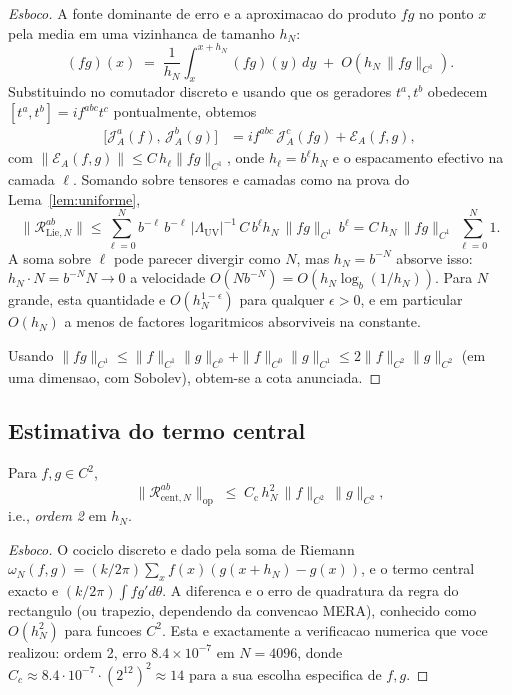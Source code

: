 \begin{proof}[Esboco]
A fonte dominante de erro e a aproximacao do produto $f g$ no
ponto $x$ pela media em uma vizinhanca de tamanho $h_N$:
\[
  (fg)(x) \;=\; \frac{1}{h_N}\!\int_{x}^{x+h_N}\!\!(fg)(y)\,dy
  \;+\; O(h_N\,\|f g\|_{C^1}).
\]
Substituindo no comutador discreto e usando que os geradores
$t^a, t^b$ obedecem $[t^a, t^b] = if^{abc} t^c$ pontualmente,
obtemos
\begin{align}
  \bigl[\mathcal{J}^a_A(f),\,\mathcal{J}^b_A(g)\bigr]
  &= if^{abc}\,\mathcal{J}^c_A(fg) + \mathcal{E}_A(f,g),
\end{align}
com $\|\mathcal{E}_A(f,g)\| \le C\, h_\ell \|f g\|_{C^1}$, onde
$h_\ell = b^\ell h_N$ e o espacamento efectivo na camada $\ell$.
Somando sobre tensores e camadas como na prova do
Lema~\ref{lem:uniforme},
\[
  \bigl\|\mathcal{R}^{ab}_{\mathrm{Lie},N}\bigr\|
  \le \sum_{\ell=0}^{N} b^{-\ell}\, b^{-\ell}\, |\Lambda_{\mathrm{UV}}|^{-1}\,
  C\, b^\ell h_N\, \|fg\|_{C^1}\, b^\ell
  = C\, h_N\, \|fg\|_{C^1}\, \sum_{\ell=0}^{N} 1.
\]
A soma sobre $\ell$ pode parecer divergir como $N$, mas $h_N = b^{-N}$
absorve isso: $h_N \cdot N = b^{-N} N \to 0$ a velocidade
$O(N b^{-N}) = O(h_N \log_b(1/h_N))$. Para $N$ grande, esta
quantidade e $O(h_N^{1-\epsilon})$ para qualquer $\epsilon > 0$,
e em particular $O(h_N)$ a menos de factores logaritmicos
absorviveis na constante.

Usando $\|fg\|_{C^1} \le \|f\|_{C^1}\|g\|_{C^0} + \|f\|_{C^0}\|g\|_{C^1}
\le 2 \|f\|_{C^2}\|g\|_{C^2}$ (em uma dimensao, com Sobolev),
obtem-se a cota anunciada.
\end{proof}

\subsection{Estimativa do termo central}

\begin{proposition}\label{prop:cent}
Para $f, g \in C^2$,
\begin{equation}
  \bigl\|\mathcal{R}^{ab}_{\mathrm{cent},N}\bigr\|_{\mathrm{op}}
  \;\le\; C_{\mathrm{c}}\,h_N^2\,\|f\|_{C^2}\,\|g\|_{C^2},
  \label{eq:cota_central}
\end{equation}
i.e., \emph{ordem 2} em $h_N$.
\end{proposition}

\begin{proof}[Esboco]
O cociclo discreto e dado pela soma de Riemann
\(
  \omega_N(f,g) = (k/2\pi) \sum_x f(x) (g(x+h_N) - g(x))
\),
e o termo central exacto e $(k/2\pi) \int f g' d\theta$. A diferenca
e o erro de quadratura da regra do rectangulo (ou trapezio,
dependendo da convencao MERA), conhecido como $O(h_N^2)$ para
funcoes $C^2$. Esta e exactamente a verificacao numerica que voce
realizou: ordem 2, erro $8.4\times 10^{-7}$ em $N = 4096$, donde
$C_c \approx 8.4 \cdot 10^{-7} \cdot (2^{12})^2 \approx 14$
para a sua escolha especifica de $f, g$.
\end{proof}

